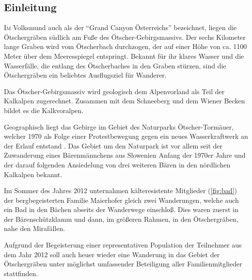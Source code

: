 \documentclass[twoside]{article}
\begin{document}
\begin{multicols}{2} %

\section{Einleitung}

\lettrine[nindent=0em,lines=3]{I} m Volksmund auch als der ``Grand Canyon Österreichs'' bezeichnet, liegen die Ötschergräben südlich am Fuße des
Ötscher-Gebirgsmassivs. Der sechs Kilometer lange Graben wird vom Ötscherbach durchzogen, der auf einer Höhe von ca. 1100 Meter über dem Meeresspiegel
entspringt. Bekannt für ihr klares Wasser und die Wasserfälle, die entlang des Ötscherbaches in den Graben stürzen, sind die Ötschergräben ein beliebtes
Ausflugsziel für Wanderer.

Das Ötscher-Gebirgsmassiv wird geologisch dem Alpenvorland als Teil der Kalkalpen zugerechnet. Zusammen mit dem Schneeberg und dem Wiener Becken bildet es die
Kalkvoralpen. \cite{SH:2012}

Geographisch liegt das Gebirge im Gebiet des Naturparks Ötscher-Tormäuer, welcher 1970 als Folge einer Protestbewegung gegen ein neues Wasserkraftwerk an der
Erlauf entstand \cite{NOT:2013:Online}. Das Gebiet um den Naturpark ist vor allem seit der Zuwanderung eines Bärenmännchens aus Slowenien Anfang der 1970er
Jahre und der darauf folgenden Ansiedelung von drei weiteren Bären in den nördlichen Kalkalpen bekannt.

Im Sommer des Jahres 2012 unternahmen kälteresistente Mitglieder (\cref{fig:bad}) der bergbegeisterten Familie Maierhofer gleich zwei Wanderungen, welche auch
ein Bad in den Bächen abseits der Wanderwege einschloß. Dies waren zuerst in der Bärenschützklamm und dann, im größeren Rahmen, in den Ötschergräben, nahe den
Mirafällen.

Aufgrund der Begeisterung einer representativen Population der Teilnehmer aus dem Jahr 2012 soll auch heuer wieder eine Wanderung in das Gebiet der
Ötschergräben unter möglichst umfassender Beteiligung aller Familienmitglieder stattfinden.


\end{multicols}
\end{document}

